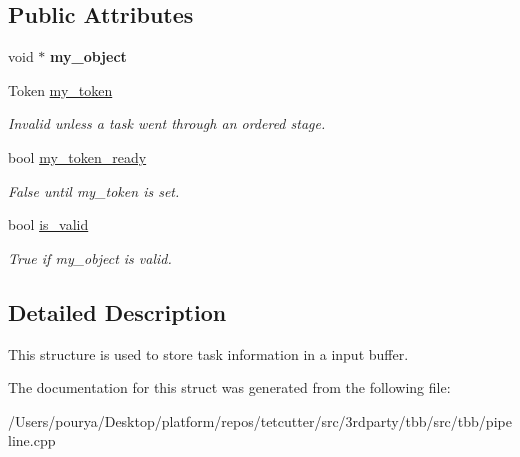 \subsection*{Public Attributes}
\begin{DoxyCompactItemize}
\item 
\hypertarget{structtbb_1_1internal_1_1task__info_a94abc643b8e23875f7ad89a3d704c475}{}void $\ast$ {\bfseries my\+\_\+object}\label{structtbb_1_1internal_1_1task__info_a94abc643b8e23875f7ad89a3d704c475}

\item 
\hypertarget{structtbb_1_1internal_1_1task__info_a03b589fe28e8c0be09c3f252689fce7c}{}Token \hyperlink{structtbb_1_1internal_1_1task__info_a03b589fe28e8c0be09c3f252689fce7c}{my\+\_\+token}\label{structtbb_1_1internal_1_1task__info_a03b589fe28e8c0be09c3f252689fce7c}

\begin{DoxyCompactList}\small\item\em Invalid unless a task went through an ordered stage. \end{DoxyCompactList}\item 
\hypertarget{structtbb_1_1internal_1_1task__info_a74673a74641dd77f3e9219506bc771d4}{}bool \hyperlink{structtbb_1_1internal_1_1task__info_a74673a74641dd77f3e9219506bc771d4}{my\+\_\+token\+\_\+ready}\label{structtbb_1_1internal_1_1task__info_a74673a74641dd77f3e9219506bc771d4}

\begin{DoxyCompactList}\small\item\em False until my\+\_\+token is set. \end{DoxyCompactList}\item 
\hypertarget{structtbb_1_1internal_1_1task__info_a730e4979c4ea260b07ccc9174dbb42cd}{}bool \hyperlink{structtbb_1_1internal_1_1task__info_a730e4979c4ea260b07ccc9174dbb42cd}{is\+\_\+valid}\label{structtbb_1_1internal_1_1task__info_a730e4979c4ea260b07ccc9174dbb42cd}

\begin{DoxyCompactList}\small\item\em True if my\+\_\+object is valid. \end{DoxyCompactList}\end{DoxyCompactItemize}


\subsection{Detailed Description}
This structure is used to store task information in a input buffer. 

The documentation for this struct was generated from the following file\+:\begin{DoxyCompactItemize}
\item 
/\+Users/pourya/\+Desktop/platform/repos/tetcutter/src/3rdparty/tbb/src/tbb/pipeline.\+cpp\end{DoxyCompactItemize}

